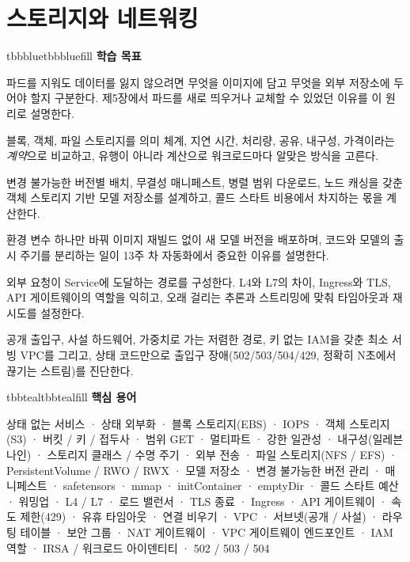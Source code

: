 \setcounter{chapter}{5}
\chapter{스토리지와 네트워킹}

\begin{calloutbox}{tbbblue}{tbbbluefill}
{\normalsize\bfseries\color{tbbblue}학습 목표}\par\vspace{3pt}
\begin{tbbitemize}
  \item 파드를 지워도 데이터를 잃지 않으려면 무엇을 이미지에 담고 무엇을 외부 저장소에 두어야 할지 구분한다. 제5장에서 파드를 새로 띄우거나 교체할 수 있었던 이유를 이 원리로 설명한다.
  \item 블록, 객체, 파일 스토리지를 의미 체계, 지연 시간, 처리량, 공유, 내구성, 가격이라는 \textit{계약}으로 비교하고, 유행이 아니라 계산으로 워크로드마다 알맞은 방식을 고른다.
  \item 변경 불가능한 버전별 배치, 무결성 매니페스트, 병렬 범위 다운로드, 노드 캐싱을 갖춘 객체 스토리지 기반 모델 저장소를 설계하고, 콜드 스타트 비용에서 차지하는 몫을 계산한다.
  \item 환경 변수 하나만 바꿔 이미지 재빌드 없이 새 모델 버전을 배포하며, 코드와 모델의 출시 주기를 분리하는 일이 13주 차 자동화에서 중요한 이유를 설명한다.
  \item 외부 요청이 Service에 도달하는 경로를 구성한다. L4와 L7의 차이, Ingress와 TLS, API 게이트웨이의 역할을 익히고, 오래 걸리는 추론과 스트리밍에 맞춰 타임아웃과 재시도를 설정한다.
  \item 공개 출입구, 사설 하드웨어, 가중치로 가는 저렴한 경로, 키 없는 IAM을 갖춘 최소 서빙 VPC를 그리고, 상태 코드만으로 출입구 장애(502/503/504/429, 정확히 N초에서 끊기는 스트림)를 진단한다.
\end{tbbitemize}
\end{calloutbox}

\vspace{5.0pt}

\begin{calloutbox}{tbbteal}{tbbtealfill}
{\normalsize\bfseries\color{tbbteal}핵심 용어}\par\vspace{3pt}
상태 없는 서비스 · 상태 외부화 · 블록 스토리지(EBS) · IOPS · 객체 스토리지(S3) · 버킷 / 키 / 접두사 · 범위 GET · 멀티파트 · 강한 일관성 · 내구성(일레븐 나인) · 스토리지 클래스 / 수명 주기 · 외부 전송 · 파일 스토리지(NFS / EFS) · PersistentVolume / RWO / RWX · 모델 저장소 · 변경 불가능한 버전 관리 · 매니페스트 · safetensors · mmap · initContainer · emptyDir · 콜드 스타트 예산 · 워밍업 · L4 / L7 · 로드 밸런서 · TLS 종료 · Ingress · API 게이트웨이 · 속도 제한(429) · 유휴 타임아웃 · 연결 비우기 · VPC · 서브넷(공개 / 사설) · 라우팅 테이블 · 보안 그룹 · NAT 게이트웨이 · VPC 게이트웨이 엔드포인트 · IAM 역할 · IRSA / 워크로드 아이덴티티 · 502 / 503 / 504
\end{calloutbox}

